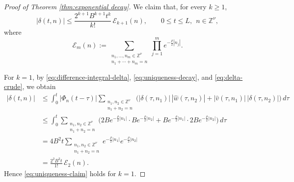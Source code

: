 \documentclass[12pt,reqno,tbtags]{amsart}
\newcommand\1{\mathbbm{1}}
\begin{document}
\begin{proof}[Proof of Theorem \ref{thm:exponential decay}]
We claim that, for every $k\geq 1$,
\begin{equation}\label{eq:uniqueness-claim}
|\delta(t,n)|
\leq
\frac{2^{k+1}B^{k+1}t^k}{k!}\,\mathcal{E}_{k+1}(n),
\qquad
0\leq t\leq L,\ \ n\in \mathbb{Z}^{\nu},
\end{equation}
where
\[
\mathcal{E}_{m}(n)
:=
\sum_{\substack{n_1,\dots,n_m\in \mathbb{Z}^{\nu}\\ n_1+\cdots+n_m=n}}
\prod_{j=1}^{m} e^{-\frac{\rho}{2}|n_j|}.
\]

For $k=1$, by \eqref{eq:difference-integral-delta}, \eqref{eq:uniqueness-decay},
and \eqref{eq:delta-crude}, we obtain
\begin{align*}
|\delta(t,n)|
&\leq
\int_0^t |\Phi_n(t-\tau)|
\sum_{\substack{n_1,n_2\in \mathbb{Z}^{\nu}\\ n_1+n_2=n}}
\Big(
|\delta(\tau,n_1)|\,|\widehat w(\tau,n_2)|
+
|\widehat v(\tau,n_1)|\,|\delta(\tau,n_2)|
\Big)\,d\tau \\
&\leq
\int_0^t
\sum_{\substack{n_1,n_2\in \mathbb{Z}^{\nu}\\ n_1+n_2=n}}
\Big(
2B e^{-\frac{\rho}{2}|n_1|}\cdot B e^{-\frac{\rho}{2}|n_2|}
+
B e^{-\frac{\rho}{2}|n_1|}\cdot 2B e^{-\frac{\rho}{2}|n_2|}
\Big)\,d\tau \\
&=
4B^2 t
\sum_{\substack{n_1,n_2\in \mathbb{Z}^{\nu}\\ n_1+n_2=n}}
e^{-\frac{\rho}{2}|n_1|}e^{-\frac{\rho}{2}|n_2|} \\
&=
\frac{2^{2}B^{2}t}{1!}\,\mathcal{E}_{2}(n).
\end{align*}
Hence \eqref{eq:uniqueness-claim} holds for $k=1$.


\end{proof}
\end{document}
